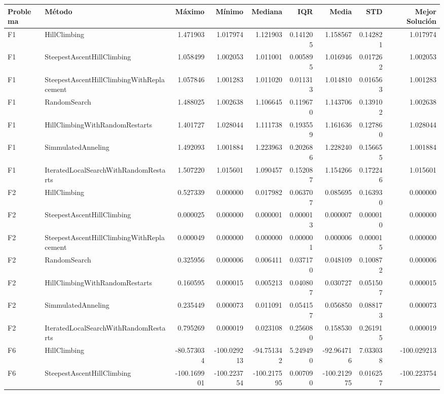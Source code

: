\begin{tabular}{llrrrrrrr}
\toprule
Problema & Método & Máximo & Mínimo & Mediana & IQR & Media & STD & Mejor Solución \\
\midrule
F1 & HillClimbing & 1.471903 & 1.017974 & 1.121903 & 0.141205 & 1.158567 & 0.142821 & 1.017974 \\
F1 & SteepestAscentHillClimbing & 1.058499 & 1.002053 & 1.011001 & 0.005895 & 1.016946 & 0.017262 & 1.002053 \\
F1 & SteepestAscentHillClimbingWithReplacement & 1.057846 & 1.001283 & 1.011020 & 0.011313 & 1.014810 & 0.016563 & 1.001283 \\
F1 & RandomSearch & 1.488025 & 1.002638 & 1.106645 & 0.119670 & 1.143706 & 0.139102 & 1.002638 \\
F1 & HillClimbingWithRandomRestarts & 1.401727 & 1.028044 & 1.111738 & 0.193559 & 1.161636 & 0.127860 & 1.028044 \\
F1 & SimmulatedAnneling & 1.492093 & 1.001884 & 1.223963 & 0.202686 & 1.228240 & 0.156655 & 1.001884 \\
F1 & IteratedLocalSearchWithRandomRestarts & 1.507220 & 1.015601 & 1.090457 & 0.152087 & 1.154266 & 0.172246 & 1.015601 \\
F2 & HillClimbing & 0.527339 & 0.000000 & 0.017982 & 0.063707 & 0.085695 & 0.163930 & 0.000000 \\
F2 & SteepestAscentHillClimbing & 0.000025 & 0.000000 & 0.000001 & 0.000013 & 0.000007 & 0.000010 & 0.000000 \\
F2 & SteepestAscentHillClimbingWithReplacement & 0.000049 & 0.000000 & 0.000000 & 0.000001 & 0.000006 & 0.000015 & 0.000000 \\
F2 & RandomSearch & 0.325956 & 0.000006 & 0.006411 & 0.037170 & 0.048109 & 0.100872 & 0.000006 \\
F2 & HillClimbingWithRandomRestarts & 0.160595 & 0.000015 & 0.005213 & 0.040807 & 0.030727 & 0.051507 & 0.000015 \\
F2 & SimmulatedAnneling & 0.235449 & 0.000073 & 0.011091 & 0.054157 & 0.056850 & 0.088173 & 0.000073 \\
F2 & IteratedLocalSearchWithRandomRestarts & 0.795269 & 0.000019 & 0.023108 & 0.256080 & 0.158530 & 0.261915 & 0.000019 \\
F6 & HillClimbing & -80.573034 & -100.029213 & -94.751342 & 5.249490 & -92.964716 & 7.033038 & -100.029213 \\
F6 & SteepestAscentHillClimbing & -100.169901 & -100.223754 & -100.217595 & 0.007090 & -100.212975 & 0.016257 & -100.223754 \\

\end{tabular}
